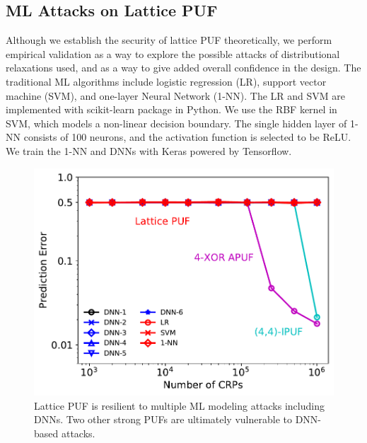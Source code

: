 
\subsection{ML Attacks on Lattice PUF}

Although we establish the security of lattice PUF theoretically, we perform empirical validation as a way to explore the possible attacks of distributional relaxations used, and as a way to give added overall confidence in the design. 
The traditional ML algorithms include logistic regression (LR), support vector machine (SVM), and one-layer Neural Network (1-NN). 
The LR and SVM are implemented with scikit-learn package in Python. 
We use the RBF kernel in SVM, which models a non-linear decision boundary. 
The single hidden layer of 1-NN consists of 100 neurons, and the activation function is selected to be ReLU. 
We train the 1-NN and DNNs with Keras powered by Tensorflow.


\begin{figure}[t!]
\centering
\includegraphics[width = 0.7\linewidth]{./figs/ml_attack_dnn_all_puf_5_new.pdf}
\caption{Lattice PUF is resilient to multiple ML modeling attacks including DNNs. Two other strong PUFs are ultimately vulnerable to DNN-based attacks.}
\label{fig:ml_attack_2}
\end{figure}

